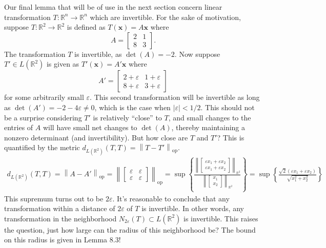 \documentclass{article}
\newcommand{\R}{\mathbb{R}}
\newcommand{\x}{\mathbf{x}}
\newcommand{\norm}[1]{\left\lVert#1\right\rVert}
\newcommand{\normop}[1]{\left\lVert#1\right\rVert_\text{op}}
\theoremstyle{definition}
\begin{document}
	Our final lemma that will be of use in the next section concern linear transformation $ T:\R^n\to\R^n $ which are invertible. For the sake of motivation, suppose $ T:\R^2\to\R^2 $ is defined as $ T(\x)=A\x $ where 
	$$A = \begin{bmatrix}
		2 & 1 \\ 8 & 3
	\end{bmatrix} .$$ The transformation $ T $ is invertible, as $ \det(A)= -2 $. Now suppose $ T'\in L(\R^2) $ is given as $ T'(\x)=A'\x $ where 
	$$A' = \begin{bmatrix}
		2 +\varepsilon & 1 +\varepsilon\\ 8 +\varepsilon& 3+\varepsilon
	\end{bmatrix} $$ for some arbitrarily small $ \varepsilon $. This second transformation will be invertible as long as $\det(A')= -2 - 4\varepsilon\neq 0$, which is the case when $ |\varepsilon| < 1/2 $. This should not be a surprise considering $ T' $ is relatively ``close'' to $ T $, and small changes to the entries of $ A $ will have small net changes to $ \det(A) $, thereby maintaining a nonzero determinant (and invertibility). But how close are $ T $ and $ T' $? This is quantified by the metric $ d_{L(\R^2)}(T,T)=\normop{T - T'} $. 
	\begin{align*}
		d_{L(\R^2)}(T,T)= \normop{A-A'}  =  \normop{\begin{bmatrix}
				\varepsilon&\varepsilon\\
				\varepsilon& \varepsilon
		\end{bmatrix}} = \sup\left\{\frac{\norm{\begin{bmatrix}
					\varepsilon x_1 + \varepsilon x_2 \\	\varepsilon x_1 + \varepsilon x_2
			\end{bmatrix}}_{\R^2}}{\norm{\begin{bmatrix}
					x_1\\x_2
			\end{bmatrix}}_{\R^2}}\right\} =\sup\left\{\frac{\sqrt{2}(\varepsilon x_1 + \varepsilon x_2)}{\sqrt{x_1^2 + x_2^2}}\right\}
	\end{align*}
	This supremum turns out to be $ 2\varepsilon $. It's reasonable to conclude that any transformation within a distance of $ 2\varepsilon $ of $ T $ is invertible. In other words, any transformation in the neighborhood $ N_{2\varepsilon}(T)\subset L(\R^2) $ is invertible. This raises the question, just how large can the radius of this neighborhood be? The bound on this radius is given in Lemma 8.3! 
	
\end{document}
